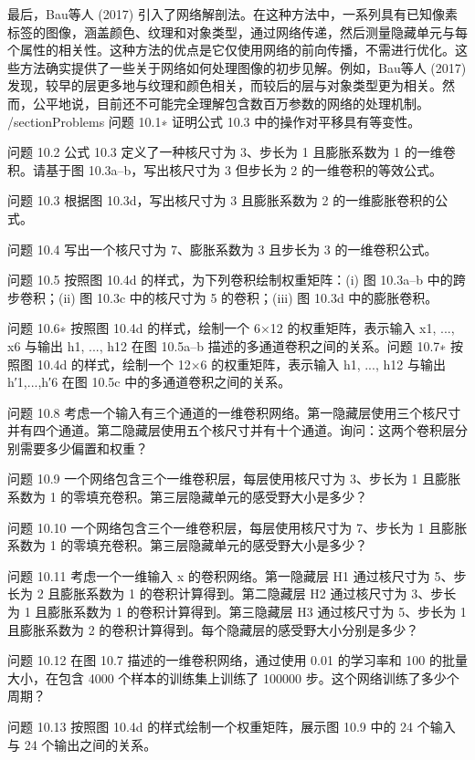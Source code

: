 最后，Bau等人 (2017) 引入了网络解剖法。在这种方法中，一系列具有已知像素标签的图像，涵盖颜色、纹理和对象类型，通过网络传递，然后测量隐藏单元与每个属性的相关性。这种方法的优点是它仅使用网络的前向传播，不需进行优化。这些方法确实提供了一些关于网络如何处理图像的初步见解。例如，Bau等人 (2017) 发现，较早的层更多地与纹理和颜色相关，而较后的层与对象类型更为相关。然而，公平地说，目前还不可能完全理解包含数百万参数的网络的处理机制。
/section{Problems}  
问题 10.1∗ 证明公式 10.3 中的操作对平移具有等变性。

问题 10.2 公式 10.3 定义了一种核尺寸为 3、步长为 1 且膨胀系数为 1 的一维卷积。请基于图 10.3a–b，写出核尺寸为 3 但步长为 2 的一维卷积的等效公式。

问题 10.3 根据图 10.3d，写出核尺寸为 3 且膨胀系数为 2 的一维膨胀卷积的公式。

问题 10.4 写出一个核尺寸为 7、膨胀系数为 3 且步长为 3 的一维卷积公式。

问题 10.5 按照图 10.4d 的样式，为下列卷积绘制权重矩阵：(i) 图 10.3a–b 中的跨步卷积；(ii) 图 10.3c 中的核尺寸为 5 的卷积；(iii) 图 10.3d 中的膨胀卷积。

问题 10.6∗ 按照图 10.4d 的样式，绘制一个 6×12 的权重矩阵，表示输入 x1, ..., x6 与输出 h1, ..., h12 在图 10.5a–b 描述的多通道卷积之间的关系。问题 10.7∗ 按照图 10.4d 的样式，绘制一个 12×6 的权重矩阵，表示输入 h1, ..., h12 与输出 h′1,...,h′6 在图 10.5c 中的多通道卷积之间的关系。

问题 10.8 考虑一个输入有三个通道的一维卷积网络。第一隐藏层使用三个核尺寸并有四个通道。第二隐藏层使用五个核尺寸并有十个通道。询问：这两个卷积层分别需要多少偏置和权重？

问题 10.9 一个网络包含三个一维卷积层，每层使用核尺寸为 3、步长为 1 且膨胀系数为 1 的零填充卷积。第三层隐藏单元的感受野大小是多少？

问题 10.10 一个网络包含三个一维卷积层，每层使用核尺寸为 7、步长为 1 且膨胀系数为 1 的零填充卷积。第三层隐藏单元的感受野大小是多少？

问题 10.11 考虑一个一维输入 x 的卷积网络。第一隐藏层 H1 通过核尺寸为 5、步长为 2 且膨胀系数为 1 的卷积计算得到。第二隐藏层 H2 通过核尺寸为 3、步长为 1 且膨胀系数为 1 的卷积计算得到。第三隐藏层 H3 通过核尺寸为 5、步长为 1 且膨胀系数为 2 的卷积计算得到。每个隐藏层的感受野大小分别是多少？

问题 10.12 在图 10.7 描述的一维卷积网络，通过使用 0.01 的学习率和 100 的批量大小，在包含 4000 个样本的训练集上训练了 100000 步。这个网络训练了多少个周期？

问题 10.13 按照图 10.4d 的样式绘制一个权重矩阵，展示图 10.9 中的 24 个输入与 24 个输出之间的关系。

